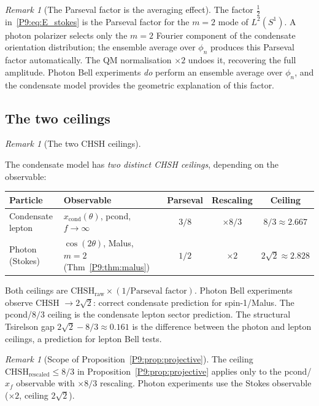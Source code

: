 \documentclass[11pt,a4paper]{article}
\theoremstyle{definition}
\theoremstyle{remark}
\newtheorem{remark}[theorem]{Remark}
\newcommand{\xcond}{x_{\mathrm{cond}}}
\newcommand{\CHSH}{\mathrm{CHSH}}
\begin{document}
\begin{remark}[The Parseval factor is the averaging effect]
\label{P9:rem:parseval_averaging}
The factor $\tfrac{1}{2}$ in~\eqref{P9:eq:E_stokes} is the Parseval factor
for the $m=2$ mode of $L^2(S^1)$.
A photon polarizer selects only the $m=2$ Fourier component of the condensate
orientation distribution; the ensemble average over $\phi_n$ produces this
Parseval factor automatically.
The QM normalisation $\times2$ undoes it, recovering the full amplitude.
Photon Bell experiments \emph{do} perform an ensemble average over $\phi_n$,
and the condensate model provides the geometric explanation of this factor.
\end{remark}

\subsection{The two ceilings}
\label{P9:sec:two_ceilings}

\begin{remark}[The two CHSH ceilings]
\label{P9:rem:two_ceilings}

The condensate model has \emph{two distinct CHSH ceilings}, depending
on the observable:
\begin{center}
\begin{tabular}{llccc}
\toprule
Particle & Observable & Parseval & Rescaling & Ceiling \\
\midrule
Condensate lepton & $\xcond(\theta)$, pcond, $f{\to}\infty$ & $3/8$ & $\times8/3$ & $8/3\approx2.667$ \\
Photon (Stokes)    & $\cos(2\theta)$, Malus, $m{=}2$ (Thm~\ref{P9:thm:malus})        & $1/2$ & $\times2$   & $2\sqrt{2}\approx2.828$ \\
\bottomrule
\end{tabular}
\end{center}
Both ceilings are $\text{CHSH}_\mathrm{raw}\times(1/\text{Parseval factor})$.
Photon Bell experiments~\cite{Hensen2015,Giustina2015,Shalm2015,Poh2015} observe
CHSH $\to2\sqrt{2}$: correct condensate prediction for spin-1/Malus.
The pcond/$8/3$ ceiling is the condensate lepton sector prediction.
The structural Tsirelson gap $2\sqrt{2}-8/3\approx0.161$ is the difference
between the photon and lepton ceilings, a prediction for lepton Bell tests.
\end{remark}
 
\begin{remark}[Scope of Proposition~\ref{P9:prop:projective}]
\label{P9:rem:projective_scope}
The ceiling $\CHSH_\mathrm{rescaled}\leq8/3$ in Proposition~\ref{P9:prop:projective}
applies only to the pcond/$x_f$ observable with $\times8/3$ rescaling.
Photon experiments use the Stokes observable ($\times2$, ceiling $2\sqrt{2}$).
\end{remark}
\end{document}
